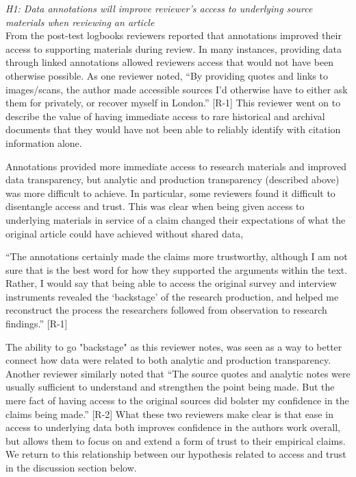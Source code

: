 \documentclass[sigchi]{acmart}
\begin{document}
\textit{H1: Data annotations will improve reviewer’s access to underlying source materials when reviewing an article}\\

From the post-test logbooks reviewers reported that annotations improved their access to supporting materials during review. In many instances, providing data through linked annotations allowed reviewers access that would not have been otherwise possible. As one reviewer noted, “By providing quotes and links to images/scans, the author made accessible sources I’d otherwise have to either ask them for privately, or recover myself in London.” [R-1]  This reviewer went on to describe the value of having immediate access to rare historical and archival documents that they would have not been able to reliably identify with citation information alone. 

Annotations provided more immediate access to research materials and improved data transparency, but analytic and production transparency (described above) was more difficult to achieve. In particular, some reviewers found it difficult to disentangle access and trust. This was clear when being given access to underlying materials in service of a claim changed their expectations of what the original article could have achieved without shared data, 

\begin{displayquote}
“The annotations certainly made the claims more trustworthy, although I am not sure that is the best word for how they supported the arguments within the text. Rather, I would say that being able to access the original survey and interview instruments revealed the ‘backstage’ of the research production, and helped me reconstruct the process the researchers followed from observation to research findings.” [R-1] 
\end{displayquote}
The ability to go "backstage" as this reviewer notes, was seen as a way to better connect how data were related to both analytic and production transparency. Another reviewer similarly noted that “The source quotes and analytic notes were usually sufficient to understand and strengthen the point being made. But the mere fact of having access to the original sources did bolster my confidence in the claims being made.” [R-2] What these two reviewers make clear is that ease in access to underlying data both improves confidence in the authors work overall, but allows them to focus on and extend a form of trust to their empirical claims. We return to this relationship between our hypothesis related to access and trust in the discussion section below.  
\end{document}
